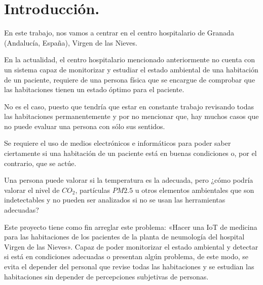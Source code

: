 \chapter{Introducción.}


\vskip 0.1in

En este trabajo, nos vamos a centrar en el centro hospitalario de Granada (Andalucía, España), Virgen de las Nieves.

En la actualidad, el centro hospitalario mencionado anteriormente no cuenta con un sistema capaz de monitorizar y estudiar el estado ambiental de una habitación de un paciente, requiere de una persona física que se encargue de comprobar que las habitaciones tienen un estado óptimo para el paciente.

No es el caso, puesto que tendría que estar en constante trabajo revisando todas las habitaciones permanentemente y por no mencionar que, hay muchos casos que no puede evaluar una persona con sólo sus sentidos.

Se requiere el uso de medios electrónicos e informáticos para poder saber ciertamente si una habitación de un paciente está en buenas condiciones o, por el contrario, que se actúe.

Una persona puede valorar si la temperatura es la adecuada, pero ¿cómo podría valorar el nivel de $CO_2$, partículas $PM2.5$ u otros elementos ambientales que son indetectables y no pueden ser analizados si no se usan las herramientas adecuadas?

Este proyecto tiene como fin arreglar este problema: «Hacer una IoT de medicina para las habitaciones de los pacientes de la planta de neumología del hospital Virgen de las Nieves». Capaz de poder monitorizar el estado ambiental y detectar si está en condiciones adecuadas o presentan algún problema, de este modo, se evita el depender del personal que revise todas las habitaciones y se estudian las habitaciones sin depender de percepciones subjetivas de personas.

%



